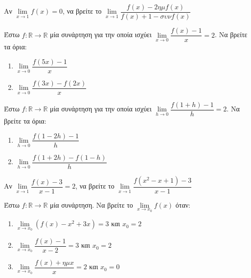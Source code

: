 \documentclass{presentation}
\begin{document}
\begin{askisi}
  Αν $\lim\limits_{x \to 1}{ f(x) }=0$, να βρείτε το $\lim\limits_{x \to 1}{ \dfrac{f(x)-2ημf(x)}{f(x)+1-συνf(x)} }$

\end{askisi}

\begin{askisi}
  Έστω $f:\mathbb{R}\to\mathbb{R}$ μία συνάρτηση για την οποία ισχύει $\lim\limits_{x \to 0}{ \dfrac{f(x)-1}{x} }=2$. Να βρείτε τα όρια:
  \begin{enumerate}
    \item $\lim\limits_{x \to 0}{ \dfrac{f(5x)-1}{x} }$ \pause
    \item $\lim\limits_{x \to 0}{ \dfrac{f(3x)-f(2x)}{x} }$
  \end{enumerate}

\end{askisi}

\begin{askisi}
  Έστω $f:\mathbb{R}\to\mathbb{R}$ μία συνάρτηση για την οποία ισχύει $\lim\limits_{h \to 0}{ \dfrac{f(1+h)-1}{h} }=2$. Να βρείτε τα όρια:
  \begin{enumerate}
    \item $\lim\limits_{h \to 0}{ \dfrac{f(1-2h)-1}{h} }$ \pause
    \item $\lim\limits_{h \to 0}{ \dfrac{f(1+2h)-f(1-h)}{h} }$
  \end{enumerate}

\end{askisi}

\begin{askisi}
  Αν $\lim\limits_{x \to 1}{ \dfrac{f(x)-3}{x-1} }=2$, να βρείτε το $\lim\limits_{x \to 1}{ \dfrac{f(x^2-x+1)-3}{x-1} }$

\end{askisi}

\begin{askisi}
  Έστω $f:\mathbb{R}\to\mathbb{R}$ μία συνάρτηση. Να βρείτε το $\lim\limits_{x \to x_0}{ f(x) }$ όταν:
  \begin{enumerate}
    \item $\lim\limits_{x \to x_0}{\left(f(x)-x^2+3x  \right)=3  }$ και $x_0=2$ \pause
    \item $\lim\limits_{x \to x_0}{\dfrac{f(x)-1}{x-2}=3  }$ και $x_0=2$ \pause
    \item $\lim\limits_{x \to x_0}{\dfrac{f(x)+ημx}{x}=2  }$ και $x_0=0$
  \end{enumerate}

\end{askisi}
\end{document}
